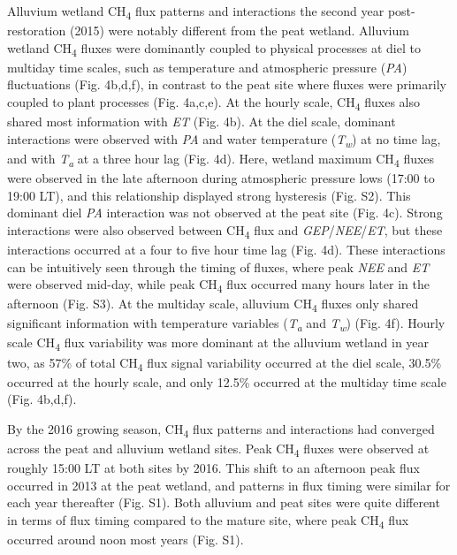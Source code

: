 \documentclass[
  12pt,
]{article}
\begin{document}
Alluvium wetland CH\textsubscript{4} flux patterns and interactions the
second year post-restoration (2015) were notably different from the peat
wetland. Alluvium wetland CH\textsubscript{4} fluxes were dominantly
coupled to physical processes at diel to multiday time scales, such as
temperature and atmospheric pressure (\emph{PA}) fluctuations (Fig.
4b,d,f), in contrast to the peat site where fluxes were primarily
coupled to plant processes (Fig. 4a,c,e). At the hourly scale,
CH\textsubscript{4} fluxes also shared most information with \emph{ET}
(Fig. 4b). At the diel scale, dominant interactions were observed with
\emph{PA} and water temperature (\emph{T\textsubscript{w}}) at no time
lag, and with \emph{T\textsubscript{a}} at a three hour lag (Fig. 4d).
Here, wetland maximum CH\textsubscript{4} fluxes were observed in the
late afternoon during atmospheric pressure lows (17:00 to 19:00 LT), and
this relationship displayed strong hysteresis (Fig. S2). This dominant
diel \emph{PA} interaction was not observed at the peat site (Fig. 4c).
Strong interactions were also observed between CH\textsubscript{4} flux
and \emph{GEP}/\emph{NEE}/\emph{ET}, but these interactions occurred at
a four to five hour time lag (Fig. 4d). These interactions can be
intuitively seen through the timing of fluxes, where peak \emph{NEE} and
\emph{ET} were observed mid-day, while peak CH\textsubscript{4} flux
occurred many hours later in the afternoon (Fig. S3). At the multiday
scale, alluvium CH\textsubscript{4} fluxes only shared significant
information with temperature variables (\emph{T\textsubscript{a}} and
\emph{T\textsubscript{w}}) (Fig. 4f). Hourly scale CH\textsubscript{4}
flux variability was more dominant at the alluvium wetland in year two,
as 57\% of total CH\textsubscript{4} flux signal variability occurred at
the diel scale, 30.5\% occurred at the hourly scale, and only 12.5\%
occurred at the multiday time scale (Fig. 4b,d,f).

By the 2016 growing season, CH\textsubscript{4} flux patterns and
interactions had converged across the peat and alluvium wetland sites.
Peak CH\textsubscript{4} fluxes were observed at roughly 15:00 LT at
both sites by 2016. This shift to an afternoon peak flux occurred in
2013 at the peat wetland, and patterns in flux timing were similar for
each year thereafter (Fig. S1). Both alluvium and peat sites were quite
different in terms of flux timing compared to the mature site, where
peak CH\textsubscript{4} flux occurred around noon most years (Fig. S1).
\end{document}
